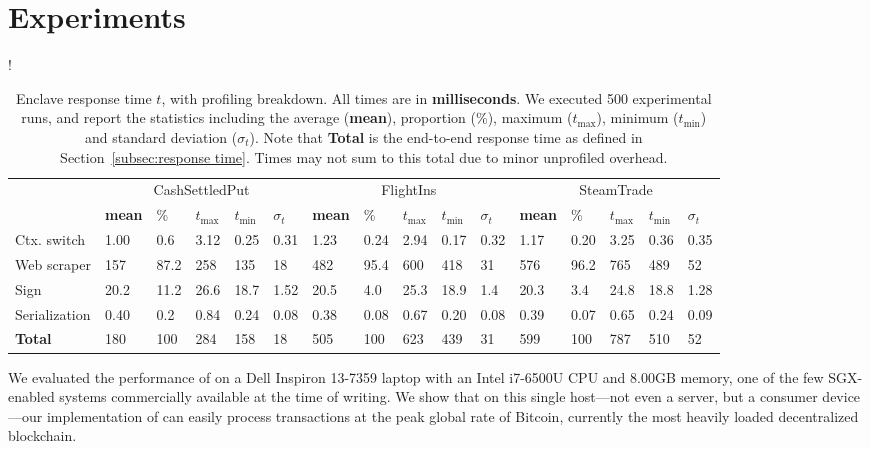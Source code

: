 \section{Experiments}
\label{sec:experiments}

\begin{table*}
\resizebox{\linewidth} {!}{
\begin{tabular}{l|lllll|lllll|lllll}
\toprule
& \multicolumn{5}{c|}{\sf CashSettledPut} &
  \multicolumn{5}{c|}{\sf FlightIns} &
  \multicolumn{5}{c}{\sf SteamTrade} \\
    & \textbf{mean} & \% & $t_{\max}$ & $t_{\min}$ & $\sigma_t$ & \textbf{mean}
    & \% & $t_{\max}$ & $t_{\min}$ & $\sigma_t$ & \textbf{mean} & \% & $t_{\max}$
    & $t_{\min}$ & $\sigma_t$\\
\midrule
    Ctx. switch & 1.00 & 0.6 & 3.12 & 0.25 & 0.31 
                & 1.23 & 0.24 & 2.94 & 0.17 & 0.32 
                & 1.17 & 0.20 & 3.25 & 0.36 & 0.35\\
    Web scraper & 157  & 87.2 & 258 & 135 & 18 
                & 482  & 95.4 & 600 & 418 & 31 
                & 576  & 96.2 & 765 & 489 & 52\\
    Sign        & 20.2 & 11.2 & 26.6 & 18.7 & 1.52 
                & 20.5 & 4.0 & 25.3 & 18.9 & 1.4 
                & 20.3 & 3.4 & 24.8 & 18.8 & 1.28\\
    Serialization 
                & 0.40 & 0.2 & 0.84 & 0.24 & 0.08 
                & 0.38 & 0.08 & 0.67 & 0.20 & 0.08 
                & 0.39 & 0.07 & 0.65 & 0.24 & 0.09\\
\midrule
\midrule
    \textbf{Total} 
                & 180 & 100 & 284 & 158 & 18 
                & 505 & 100 & 623 & 439 & 31 
                & 599 & 100 & 787 & 510 & 52 \\
\bottomrule
\end{tabular}
}
\caption{Enclave response time $t$, with profiling breakdown. All times are in {\bf milliseconds}.
We executed 500 experimental runs, and report
the statistics including 
the average ({\bf mean}), proportion (\%), maximum ($t_{\max}$),
minimum ($t_{\min}$) and standard deviation ($\sigma_t$). Note that {\bf Total} is the end-to-end response time as 
defined in Section~\ref{subsec:response time}. Times may not
sum to this total due to minor unprofiled overhead.}
\label{tab:eval_profiling}
\end{table*}

We evaluated the performance of \tc on a Dell Inspiron 13-7359 laptop 
with an Intel i7-6500U CPU and 8.00GB memory, one of the few SGX-enabled systems commercially available at the
time of writing. We
show that on this single host---not even a server, but a consumer device---our implementation of \tc can easily process
transactions at the peak global rate of Bitcoin, currently the most heavily loaded decentralized blockchain. 

